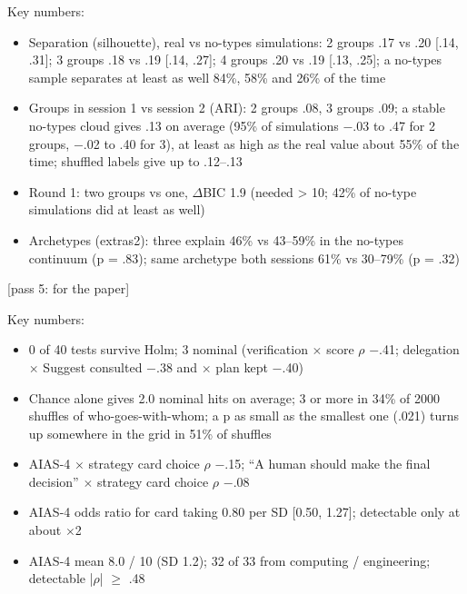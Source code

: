 \begin{options}
\noindent Key numbers:\begin{itemize}[leftmargin=1.2em,itemsep=0pt]\footnotesize
\item Separation (silhouette), real vs no-types simulations: 2 groups .17 vs .20 [.14, .31]; 3 groups .18 vs .19 [.14, .27]; 4 groups .20 vs .19 [.13, .25]; a no-types sample separates at least as well 84\%, 58\% and 26\% of the time
\item Groups in session 1 vs session 2 (ARI): 2 groups .08, 3 groups .09; a stable no-types cloud gives .13 on average (95\% of simulations $-$.03 to .47 for 2 groups, $-$.02 to .40 for 3), at least as high as the real value about 55\% of the time; shuffled labels give up to .12--.13
\item Round 1: two groups vs one, $\Delta$BIC 1.9 (needed > 10; 42\% of no-type simulations did at least as well)
\item Archetypes (extras2): three explain 46\% vs 43--59\% in the no-types continuum (p = .83); same archetype both sessions 61\% vs 30--79\% (p = .32)
\end{itemize}

 {\footnotesize [pass 5: for the paper]}

\noindent Key numbers:\begin{itemize}[leftmargin=1.2em,itemsep=0pt]\footnotesize
\item 0 of 40 tests survive Holm; 3 nominal (verification $\times$ score $\rho$ $-$.41; delegation $\times$ Suggest consulted $-$.38 and $\times$ plan kept $-$.40)
\item Chance alone gives 2.0 nominal hits on average; 3 or more in 34\% of 2000 shuffles of who-goes-with-whom; a p as small as the smallest one (.021) turns up somewhere in the grid in 51\% of shuffles
\item AIAS-4 $\times$ strategy card choice $\rho$ $-$.15; ``A human should make the final decision'' $\times$ strategy card choice $\rho$ $-$.08
\item AIAS-4 odds ratio for card taking 0.80 per SD [0.50, 1.27]; detectable only at about $\times$2
\item AIAS-4 mean 8.0 / 10 (SD 1.2); 32 of 33 from computing / engineering; detectable |$\rho$| $\geq$ .48
\end{itemize}
\end{options}

\clearpage


